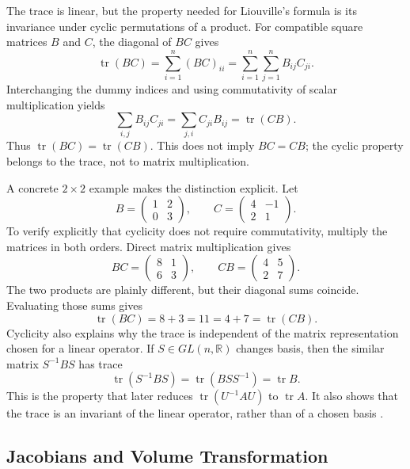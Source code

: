 \documentclass[11pt,a4paper]{article}
\newcommand{\be}{\begin{equation}}
\newcommand{\ee}{\end{equation}}
\newcommand{\lb}[1]{\label{#1}}
\newcommand{\R}{\mathbb{R}}
\DeclareMathOperator{\tr}{tr}
\theoremstyle{definition}
\numberwithin{equation}{section}
\begin{document}
The trace is linear, but the property needed for Liouville's formula is its invariance under cyclic permutations of a product. For compatible square matrices $B$ and $C$, the diagonal of $BC$ gives
\be
\tr(BC)
=
\sum_{i=1}^{n}(BC)_{ii}
=
\sum_{i=1}^{n}\sum_{j=1}^{n}B_{ij}C_{ji}.
\lb{eq:trace-product-components}
\ee
Interchanging the dummy indices and using commutativity of scalar multiplication yields
\be
\sum_{i,j}B_{ij}C_{ji}
=
\sum_{j,i}C_{ji}B_{ij}
=
\tr(CB).
\lb{eq:trace-cyclic}
\ee
Thus $\tr(BC)=\tr(CB)$. This does not imply $BC=CB$; the cyclic property belongs to the trace, not to matrix multiplication.

A concrete $2\times2$ example makes the distinction explicit. Let
\be
B=
\begin{pmatrix}
1&2\\
0&3
\end{pmatrix},
\qquad
C=
\begin{pmatrix}
4&-1\\
2&1
\end{pmatrix}.
\lb{eq:trace-example-matrices}
\ee
To verify explicitly that cyclicity does not require commutativity, multiply the matrices in both orders. Direct matrix multiplication gives
\be
BC=
\begin{pmatrix}
8&1\\
6&3
\end{pmatrix},
\qquad
CB=
\begin{pmatrix}
4&5\\
2&7
\end{pmatrix}.
\lb{eq:trace-example-products}
\ee
The two products are plainly different, but their diagonal sums coincide. Evaluating those sums gives
\be
\tr(BC)=8+3=11=4+7=\tr(CB).
\lb{eq:trace-example-result}
\ee
Cyclicity also explains why the trace is independent of the matrix representation chosen for a linear operator. If $S\in GL(n,\R)$ changes basis, then the similar matrix $S^{-1}BS$ has trace
\be
\tr(S^{-1}BS)
=
\tr(BSS^{-1})
=
\tr B.
\lb{eq:trace-similarity}
\ee
This is the property that later reduces $\tr(U^{-1}AU)$ to $\tr A$. It also shows that the trace is an invariant of the linear operator, rather than of a chosen basis \cite{horn2013}.

\subsection{Jacobians and Volume Transformation}
\end{document}
